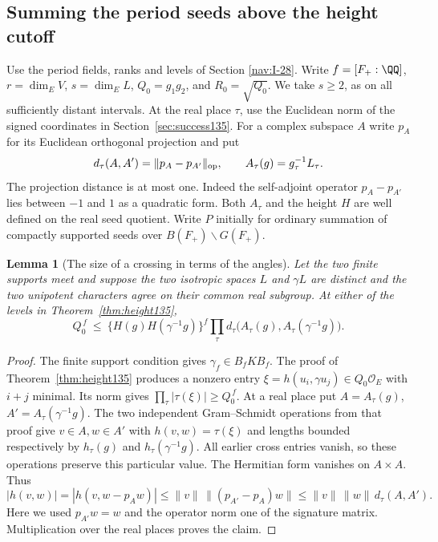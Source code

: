 \documentclass[a4paper,11pt]{article}
\newtheorem{lemma}[proposition]{Lemma}
\theoremstyle{definition}
\theoremstyle{remark}
\numberwithin{equation}{section}
\begin{document}
\subsection{Summing the period seeds above the height cutoff}\label{nav:VII-04}
\label{sec:angle149}

Use the period fields, ranks and levels of
Section \ref{nav:I-28}.
Write \(f=[F_+:\QQ]\), \(r=\dim_E V\), \(s=\dim_E L\),
\(Q_0=g_1g_2\), and \(R_0=\sqrt{Q_0}\). We take \(s\ge2\),
as on all sufficiently distant intervals. At the real place
\(\tau\), use the Euclidean norm of the signed coordinates in
Section~\ref{sec:success135}. For a complex subspace \(A\)
write \(p_A\) for its Euclidean orthogonal projection and put
\[
  d_\tau(A,A')=\|p_A-p_{A'}\|_{\rm op},\qquad
  A_\tau(g)=g_\tau^{-1}L_\tau .
\]
The projection distance is at most one. Indeed the self-adjoint
operator \(p_A-p_{A'}\) lies between \(-1\) and \(1\) as a
quadratic form. Both \(A_\tau\) and the height \(H\) are
well defined on the real seed quotient. Write \(P\) initially
for ordinary summation of compactly supported seeds over
\(B(F_+)\backslash G(F_+)\).

\begin{lemma}[The size of a crossing in terms of the angles]
\label{lem:angle149}
Let the two finite supports meet and suppose the two isotropic
spaces \(L\) and \(\gamma L\) are distinct and the two unipotent
characters agree on their common real subgroup. At either of
the levels in Theorem~\ref{thm:height135},
\[
 Q_0^{\,f}\ \le\
     \{H(g)H(\gamma^{-1}g)\}^{f}
      \prod_\tau d_\tau\big(A_\tau(g),A_\tau(\gamma^{-1}g)\big).
\]
\end{lemma}
\begin{proof}
The finite support condition gives \(\gamma_f\in B_f K B_f\).
The proof of Theorem~\ref{thm:height135} produces a nonzero
entry \(\xi=h(u_i,\gamma u_j)\in Q_0\mathcal O_E\) with
\(i+j\) minimal. Its norm gives
\(\prod_\tau|\tau(\xi)|\ge Q_0^{\,f}\).
At a real place put \(A=A_\tau(g)\), \(A'=A_\tau(\gamma^{-1}g)\).
The two independent Gram--Schmidt operations from that proof
give \(v\in A,w\in A'\) with \(h(v,w)=\tau(\xi)\) and lengths
bounded respectively by \(h_\tau(g)\) and
\(h_\tau(\gamma^{-1}g)\). All earlier cross entries vanish,
so these operations preserve this particular value. The
Hermitian form vanishes on \(A\times A\). Thus
\[
 |h(v,w)|=|h(v,w-p_Aw)|
  \le \|v\|\,\|(p_{A'}-p_A)w\|
  \le \|v\|\,\|w\|\,d_\tau(A,A').
\]
Here we used \(p_{A'}w=w\) and the operator norm one of the
signature matrix. Multiplication over the real places proves
the claim.
\end{proof}
\end{document}
